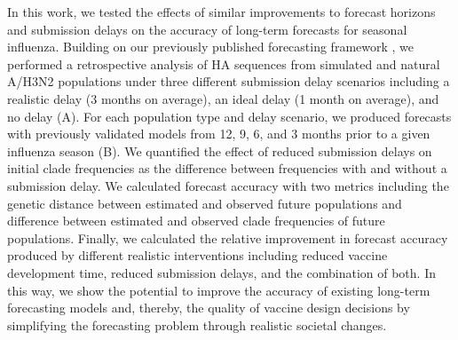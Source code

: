 \documentclass[9pt,lineno]{elife}
\begin{document}
In this work, we tested the effects of similar improvements to forecast horizons and submission delays on the accuracy of long-term forecasts for seasonal influenza.
Building on our previously published forecasting framework \citep{Huddleston2020}, we performed a retrospective analysis of HA sequences from simulated and natural A/H3N2 populations under three different submission delay scenarios including a realistic delay (3 months on average), an ideal delay (1 month on average), and no delay (A).
For each population type and delay scenario, we produced forecasts with previously validated models from 12, 9, 6, and 3 months prior to a given influenza season (B).
We quantified the effect of reduced submission delays on initial clade frequencies as the difference between frequencies with and without a submission delay.
We calculated forecast accuracy with two metrics including the genetic distance between estimated and observed future populations and difference between estimated and observed clade frequencies of future populations.
Finally, we calculated the relative improvement in forecast accuracy produced by different realistic interventions including reduced vaccine development time, reduced submission delays, and the combination of both.
In this way, we show the potential to improve the accuracy of existing long-term forecasting models and, thereby, the quality of vaccine design decisions by simplifying the forecasting problem through realistic societal changes.

\end{document}
